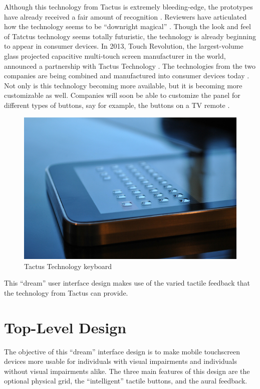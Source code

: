 \documentclass[11pt]{article}
\begin{document}
Although this technology from Tactus is extremely bleeding-edge, the prototypes have already received a fair amount of recognition \cite{CNN, I-Zone, PCMag, Wired}. Reviewers have articulated how the technology seems to be ``downright magical'' \cite{CNN}. Though the look and feel of Tatctus technology seems totally futuristic, the technology is already beginning to appear in consumer devices. In 2013, Touch Revolution, the largest-volume glass projected capacitive multi-touch screen manufacturer in the world, announced a partnership with Tactus Technology \cite{TactusAvailability}. The technologies from the two companies are being combined and manufactured into consumer devices today \cite{TactusAvailability}. Not only is this technology becoming more  available, but it is becoming more customizable as well. Companies will soon be able to customize the panel for different types of buttons, say for example, the buttons on a TV remote \cite{CNN}.

\begin{figure}[ht]
\centering
\includegraphics[width=4.5in]{tactus2.jpg} 
\caption{Tactus Technology keyboard}
\label{tactus1}
\end{figure}

This ``dream'' user interface design makes use of the varied tactile feedback that the technology from Tactus can provide.


\section{Top-Level Design}
The objective of this ``dream'' interface design is to make mobile touchscreen devices more usable for individuals with visual impairments and individuals without visual impairments alike. The three main features of this design are the optional physical grid, the ``intelligent'' tactile buttons, and the aural feedback. 
\end{document}
